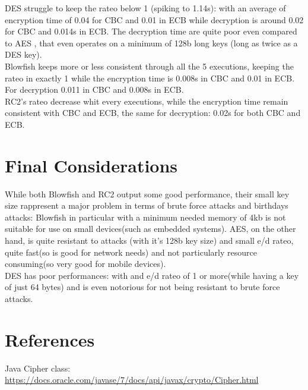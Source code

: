 \documentclass{article}
\begin{document}
	DES struggle to keep the rateo below 1 (spiking to 1.14s): with an average of encryption time of 
	0.04 for CBC and 0.01 in ECB while decryption is around 0.02 for CBC and 0.014s in ECB.
	The decryption time are quite poor even compared to AES , that even operates on a minimum of 	128b long keys (long as twice as a DES key).\\

	Blowfish keeps more or less consistent through all the 5 executions, keeping the rateo in exactly 1 	while the encryption time is 0.008s in CBC and 0.01 in ECB. For decryption 0.011 in CBC and 
	0.008s in ECB.\\
	
	RC2's rateo decrease whit every executions, while the encryption time remain consistent with 		CBC and ECB, the same for decryption: 0.02s for both CBC and ECB.\\

	\section{Final Considerations}\label{sec:trFinalConsid}
	While both Blowfish and RC2 output some good performance, their small key size rappresent 		a major problem in terms of brute force attacks and birthdays attacks: Blowfish in particular with a 	minimum needed memory of 4kb is not suitable for use on small devices(such as embedded systems). AES, on the other hand, is quite resistant to attacks (with it's 128b key size) and small e/d rateo, quite fast(so is good for network needs) and not particularly resource consuming(so very good for mobile devices).\\ DES has poor performances: with and e/d rateo of 1 or more(while having a key of just 64 bytes) and is even notorious for not being resistant to brute force attacks.

	\section{References}\label{sec:ref}
	
	Java Cipher class: \url{https://docs.oracle.com/javase/7/docs/api/javax/crypto/Cipher.html}
	
	
	
		
\end{document}

